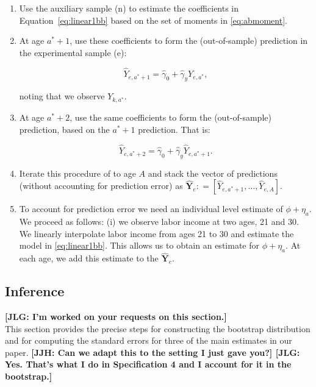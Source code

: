 \begin{enumerate}
\item Use the auxiliary sample (n) to estimate the coefficients in Equation~\eqref{eq:linear1bb} based on the set of moments in \eqref{eq:abmoment}. 
\item At age $a^*+1$, use these coefficients to form the (out-of-sample) prediction in the experimental sample (e): 

\begin{equation}
\hat{Y}_{e,a^* + 1} = \hat{\gamma}_{0} + \hat{\gamma}_{y} Y_{e,a^*}, 
\end{equation}

\noindent noting that we observe $Y_{k,a^*}$.
 
\item At age $a^*+2$, use the same coefficients to form the (out-of-sample) prediction, based on the $a^*+1$ prediction. That is: 

\begin{equation}
\hat{Y}_{e,a^* + 2} = \hat{\gamma}_{0} + \hat{\gamma}_{y} \hat{Y}_{e,a^*+1}.
\end{equation}

\item Iterate this procedure of to age $A$ and stack the vector of predictions (without accounting for prediction error) as $\hat{\bm{Y}}_{e} : = \left[ \hat{Y}_{e,a^*+1}, \ldots,  \hat{Y}_{e,A} \right]$.
\item To account for prediction error we need an individual level estimate of $ \phi + \eta_{a}$. We proceed as follows: (i) we observe labor income at two ages, 21 and 30. We linearly interpolate labor income from ages 21 to 30 and estimate the model in \eqref{eq:linear1bb}. This allows us to obtain an estimate for $\phi + \eta_{a}$. At each age, we add this estimate to the $\hat{\bm{Y}}_{e}$. 
\end{enumerate}

\subsection{Inference} \label{appendix:bootstrap}
\noindent \textbf{[JLG: I'm worked on your requests on this section.]}\\

\noindent This section provides the precise steps for constructing the bootstrap distribution and for computing the standard errors for three of the main estimates in our paper. \textbf{[JJH: Can we adapt this to the setting I just gave you?] [JLG: Yes. That's what I do in \textbf{Specification 4} and I account for it in the bootstrap.]}

